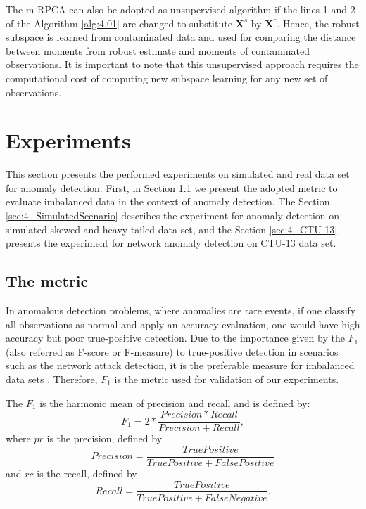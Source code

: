 The m-RPCA can also be adopted as unsupervised algorithm if the lines 1 and 2 of the Algorithm \ref{alg:4.01} are changed to substitute $\pmb{X}^s$ by $\pmb{X}^c$. Hence, the robust subspace is learned from contaminated data and used for comparing the distance between moments from robust estimate and moments of contaminated observations. It is important to note that this unsupervised approach requires the computational cost of computing new subspace learning for any new set of observations.


\section{Experiments}
\label{sec:4_experiments}

This section presents the performed experiments on simulated and real data set for anomaly detection. First, in Section \ref{sec:4_metric} we present the adopted metric to evaluate imbalanced data in the context of anomaly detection. The Section \ref{sec:4_SimulatedScenario} describes the experiment for anomaly detection on simulated skewed and heavy-tailed data set, and the Section \ref{sec:4_CTU-13} presents the experiment for network anomaly detection on CTU-13 data set.

\subsection{The metric}
\label{sec:4_metric}

In anomalous detection problems, where anomalies are rare events, if one classify all observations as normal and apply an accuracy evaluation, one would have high accuracy but poor true-positive detection. Due to the importance given by the $F_1$ (also referred as F-score or F-measure) to true-positive detection in scenarios such as the network attack detection, it is the preferable measure for imbalanced data sets \cite{powers2011evaluation,moustafa2019holistic}. Therefore, $F_1$ is the metric used for validation of our experiments.

The $F_1$ is the harmonic mean of precision and recall and is defined by:
\begin{equation}\label{eq:4.15}
	F_1 = 2 * \frac{Precision * Recall}{Precision + Recall},
\end{equation}
where $pr$ is the precision, defined by 
\begin{equation}\label{eq:4.16}
	Precision = \frac{True Positive}{True Positive + False Positive}
\end{equation}
and $rc$ is the recall, defined by 
\begin{equation}\label{eq:4.17}
	Recall = \frac{True Positive}{True Positive + False Negative}.
\end{equation}

